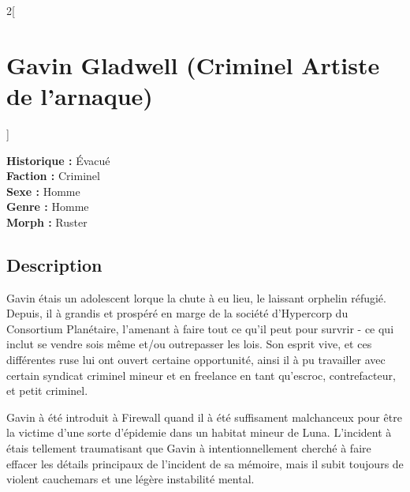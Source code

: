 \documentclass[a4paper,9pt]{article}
\begin{document}
\begin{multicols}{2}[\section*{Gavin Gladwell (Criminel Artiste de l'arnaque)}]

   \noindent\textbf{Historique :} Évacué\\
   \noindent\textbf{Faction :} Criminel\\
   \noindent\textbf{Sexe :} Homme\\
   \noindent\textbf{Genre :} Homme\\
   \noindent\textbf{Morph :} Ruster\\

   \subsection*{Description}

   Gavin étais un adolescent lorque la chute à eu lieu, le laissant orphelin réfugié.
   Depuis, il à grandis et prospéré en marge de la société d'Hypercorp du
   Consortium Planétaire, l'amenant à faire tout ce qu'il peut pour survrir - ce
   qui inclut se vendre sois même et/ou outrepasser les lois.
   Son esprit vive, et ces différentes ruse lui ont ouvert certaine opportunité,
   ainsi il à pu travailler avec certain syndicat criminel mineur et en freelance
   en tant qu'escroc, contrefacteur, et petit criminel.

   Gavin à été introduit à Firewall quand il à été suffisament malchanceux pour
   être la victime d'une sorte d'épidemie dans un habitat mineur de Luna.
   L'incident à étais tellement traumatisant que Gavin à intentionnellement
   cherché à faire effacer les détails principaux de l'incident de sa mémoire,
   mais il subit toujours de violent cauchemars et une légère instabilité mental.


\end{multicols}
\end{document}
